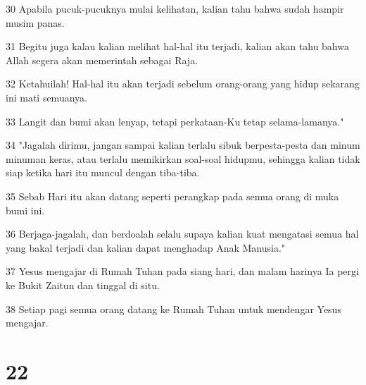 \par 30 Apabila pucuk-pucuknya mulai kelihatan, kalian tahu bahwa sudah hampir musim panas.
\par 31 Begitu juga kalau kalian melihat hal-hal itu terjadi, kalian akan tahu bahwa Allah segera akan memerintah sebagai Raja.
\par 32 Ketahuilah! Hal-hal itu akan terjadi sebelum orang-orang yang hidup sekarang ini mati semuanya.
\par 33 Langit dan bumi akan lenyap, tetapi perkataan-Ku tetap selama-lamanya."
\par 34 "Jagalah dirimu, jangan sampai kalian terlalu sibuk berpesta-pesta dan minum minuman keras, atau terlalu memikirkan soal-soal hidupmu, sehingga kalian tidak siap ketika hari itu muncul dengan tiba-tiba.
\par 35 Sebab Hari itu akan datang seperti perangkap pada semua orang di muka bumi ini.
\par 36 Berjaga-jagalah, dan berdoalah selalu supaya kalian kuat mengatasi semua hal yang bakal terjadi dan kalian dapat menghadap Anak Manusia."
\par 37 Yesus mengajar di Rumah Tuhan pada siang hari, dan malam harinya Ia pergi ke Bukit Zaitun dan tinggal di situ.
\par 38 Setiap pagi semua orang datang ke Rumah Tuhan untuk mendengar Yesus mengajar.

\chapter{22}

